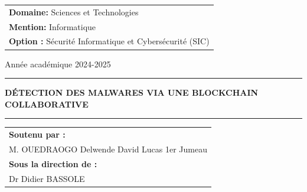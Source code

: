 \documentclass[12pt]{report}
\begin{document}
\begin{titlepage}
\begin{center}

\begin{center} 
\begin{tabular}{p{}} 
\centering \large{ \textbf{Domaine:}}   \large{ Sciences et Technologies } \\
\centering \large{ \textbf{Mention:}}   \large{ Informatique }  \\
\centering \large{ \textbf{Option :}}   \large{ Sécurité Informatique et Cybersécurité (SIC) }
\end{tabular}
\end{center}



\large{ {Année académique 2024-2025}\\ }
\textcolor{blue}{\noindent\rule{\textwidth}{0.25mm}}
\large{\textbf{\textcolor{myColor}{DÉTECTION DES MALWARES VIA UNE
BLOCKCHAIN COLLABORATIVE }}}
\textcolor{blue}{\noindent\rule{\textwidth}{0.25mm}}
\end{center}
\vspace{0.3cm}




\begin{tabular}{>{\centering\arraybackslash}p{\textwidth}} 

\textbf{Soutenu par :} \\
M. OUEDRAOGO Delwende David Lucas 1er Jumeau  \\ [4ex] 

\textbf{Sous la direction de :} \\
Dr Didier BASSOLE \\

\end{tabular}


\end{titlepage}
\end{document}
